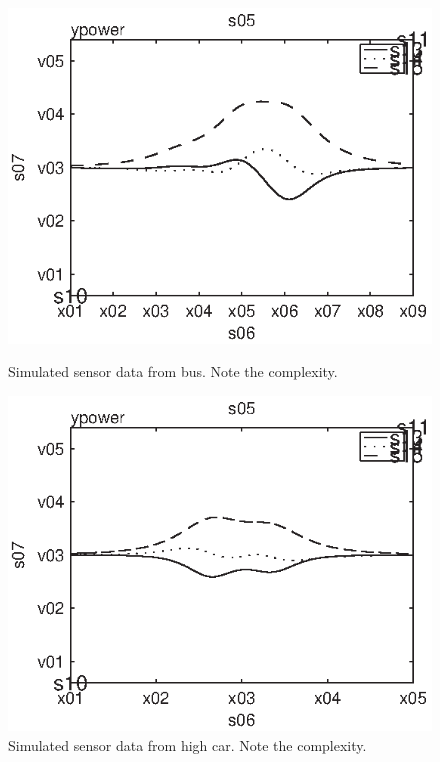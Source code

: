 \begin{subfigures}
\begin{figure}[tfhb]
 \begin{minipage}{0.45\linewidth}
 	\centering
 	
    	\includegraphics[width=1\linewidth]{images/bus}
  	\caption[Simulated sensor data from a bus]{Simulated sensor data from bus. Note the complexity.}
  	\label{fig:simclass3}
 \end{minipage} \hfill
 \begin{minipage}{0.45\linewidth}
 	\centering
 	
   	\includegraphics[width=1\linewidth]{images/highcar}
  	\caption[Simulated sensor data from high car]{Simulated sensor data from high car. Note the complexity.}
  	\label{fig:simclass4}
 \end{minipage}
\end{figure}
\end{subfigures}

